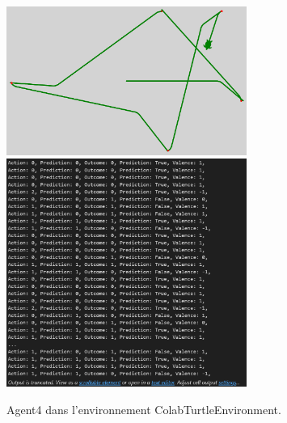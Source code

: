 \documentclass[a4paper, 12pt]{article}
\begin{document}
\begin{figure}[h]
    \centering
    \includegraphics[width=0.7\textwidth]{ReportImages/Agent4/Agent4_tortue.png}
    \includegraphics[width=0.7\textwidth]{ReportImages/Agent4/Agent4_50_actions.png}
    \caption{Agent4 dans l'environnement ColabTurtleEnvironment.}
    \label{fig:agent4_envTurtle}
\end{figure}
\end{document}
